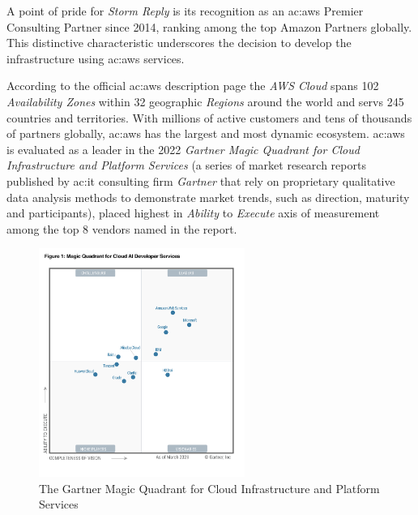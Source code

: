 A point of pride for \textit{Storm Reply} is its recognition as an \gls{ac:aws} Premier Consulting Partner since 2014, ranking among the top Amazon Partners globally. This distinctive characteristic underscores the decision to develop the infrastructure using \gls{ac:aws} services.

According to the official \gls{ac:aws} description page \cite{AWSGlobalInfrastructure} the \textit{AWS Cloud} spans 102 \textit{Availability Zones} within 32 geographic \textit{Regions} around the world and servs 245 countries and territories. With millions of active customers and tens of thousands of partners globally, \gls{ac:aws} has the largest and most dynamic ecosystem. \gls{ac:aws} is evaluated as a leader in the 2022 \textit{Gartner Magic Quadrant for Cloud Infrastructure and Platform Services} (a series of market research reports published by \gls{ac:it} consulting firm \textit{Gartner} that rely on proprietary qualitative data analysis methods to demonstrate market trends, such as direction, maturity and participants), placed highest in \textit{Ability} to \textit{Execute} axis of measurement among the top 8 vendors named in the report.

\begin{figure}[h]  %
  \centering
  \includegraphics[width=0.6\textwidth]{images/AWSMagicQuadrantForCloud.png}  %
  \caption{The Gartner Magic Quadrant for Cloud Infrastructure and Platform Services \cite{GartnerMagicQuadrant}}
  \label{fig:AWSMagicQuadrantForCloud}
\end{figure}

